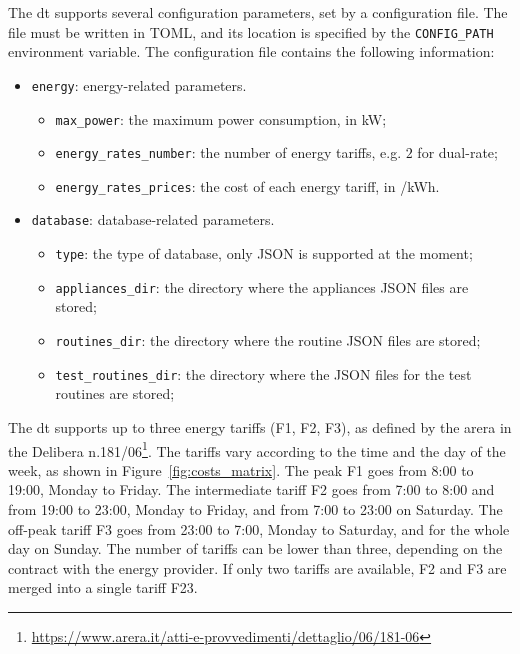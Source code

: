 The \acrshort{dt} supports several configuration parameters, set by a configuration file. The file must be written in TOML, and its location is specified by the \texttt{CONFIG\_PATH} environment variable. The configuration file contains the following information:
\begin{itemize}
    \item \texttt{energy}: energy-related parameters.
          \begin{itemize}
              \item \texttt{max\_power}: the maximum power consumption, in kW;\@
              \item \texttt{energy\_rates\_number}: the number of energy tariffs, e.g. \(2\) for dual-rate;
              \item \texttt{energy\_rates\_prices}: the cost of each energy tariff, in \texteuro/kWh.
          \end{itemize}
    \item \texttt{database}: database-related parameters.
          \begin{itemize}
              \item \texttt{type}: the type of database, only JSON is supported at the moment;
              \item \texttt{appliances\_dir}: the directory where the appliances JSON files are stored;
              \item \texttt{routines\_dir}: the directory where the routine JSON files are stored;
              \item \texttt{test\_routines\_dir}: the directory where the JSON files for the test routines are stored;
          \end{itemize}
\end{itemize}

The \acrshort{dt} supports up to three energy tariffs (F1, F2, F3), as defined by the \acrfull{arera} in the Delibera n.181/06\footnote{\url{https://www.arera.it/atti-e-provvedimenti/dettaglio/06/181-06}}. The tariffs vary according to the time and the day of the week, as shown in Figure~\ref{fig:costs_matrix}. The peak F1 goes from 8:00 to 19:00, Monday to Friday. The intermediate tariff F2 goes from 7:00 to 8:00 and from 19:00 to 23:00, Monday to Friday, and from 7:00 to 23:00 on Saturday. The off-peak tariff F3 goes from 23:00 to 7:00, Monday to Saturday, and for the whole day on Sunday. The number of tariffs can be lower than three, depending on the contract with the energy provider. If only two tariffs are available, F2 and F3 are merged into a single tariff F23.

